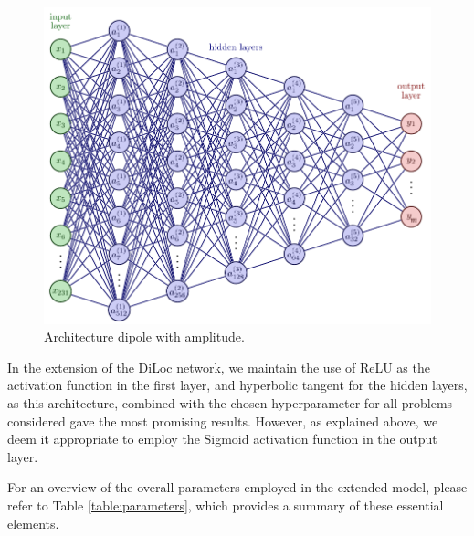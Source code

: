 \documentclass[a4paper, UKenglish, 11pt]{uiomaster}
\begin{document}
\begin{figure}[!htb]
    \centering
    \includegraphics[width=\linewidth]{figures/NN_architecture_multiple_outputs.pdf}
    \caption{Architecture dipole with amplitude.}
    \label{fig:NN_dipole_w_amplitude_architecture}
\end{figure}

In the extension of the DiLoc network, we maintain the use of ReLU as the activation function in the first layer, and hyperbolic tangent for the hidden layers, as this architecture, combined with the chosen hyperparameter for all problems considered gave the most promising results. However, as explained above, we deem it appropriate to employ the Sigmoid activation function in the output layer.

For an overview of the overall parameters employed in the extended model, please refer to Table \ref{table:parameters}, which provides a summary of these essential elements.
\end{document}
